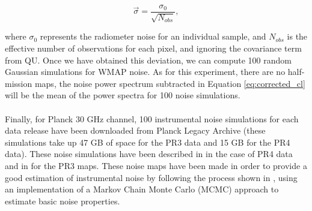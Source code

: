 \begin{equation}
    \label{eq:wmap_noise}
    \vec{\sigma} = \frac{\sigma_{0}}{\sqrt{N_{obs}}},
\end{equation}

where $\sigma_{0}$ represents the radiometer noise for an individual sample, and $N_{obs}$ is the effective number of observations for each pixel, 
and ignoring the covariance term from QU. Once we have obtained this deviation, we can compute 100 random Gaussian simulations for WMAP noise. 
As for this experiment, there are no half-mission maps, the noise power spectrum subtracted in Equation \ref{eq:corrected_cl} will be the mean of the power spectra for 100 noise simulations.
\paragraph*{}

Finally, for Planck 30 GHz channel, 100 instrumental noise simulations for each data release have been downloaded from Planck Legacy Archive (these simulations take up 47 GB of space for the PR3 data and 15 GB for the PR4 data). These noise simulations have been described in \citealp{Planck_PR4_maps} in the case of PR4 data and in \citealp{Planck_pr3_maps} for the PR3 maps. These noise maps have been made in order to provide a good estimation of instrumental noise by following the process shown in \citealp{Planck_2014b}, using an implementation 
of a Markov Chain Monte Carlo (MCMC) approach to estimate basic noise properties.
\paragraph*{}


